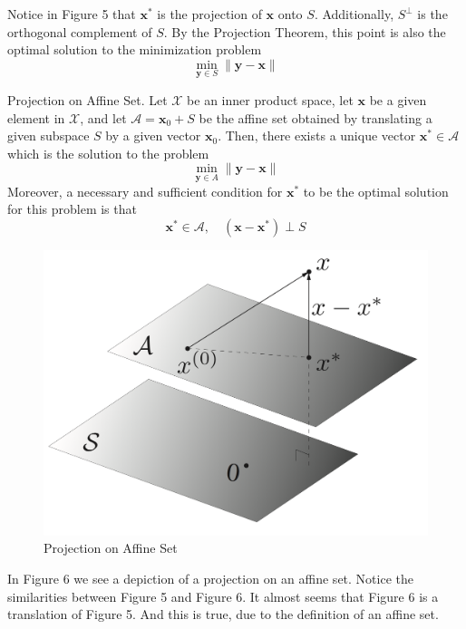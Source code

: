 \documentclass[12pt]{article}
\begin{document}
\noindent Notice in Figure 5 that $\mathbf{x}^*$ is the projection of $\mathbf{x}$ onto $S$. Additionally, $S^\perp$ is the orthogonal complement of $S$. By the Projection Theorem, this point is also the optimal solution to the minimization problem  $$\min_{\mathbf{y}\in S} \|\mathbf{y}-\mathbf{x}\|$$

\begin{corollary}
Projection on Affine Set. Let $\mathcal{X}$ be an inner product space, let $\mathbf{x}$ be a given element in $\mathcal{X}$, and let $\mathcal{A}=\mathbf{x}_0 + S$ be the affine set obtained by translating a given subspace $S$ by a given vector $\mathbf{x}_0$. Then, there exists a unique vector $\mathbf{x}^*\in\mathcal{A}$ which is the solution to the problem $$\min_{\mathbf{y}\in A} \|\mathbf{y}-\mathbf{x}\|$$ Moreover, a necessary and sufficient condition for $\mathbf{x}^*$ to be the optimal solution for this problem is that $$\mathbf{x}^*\in \mathcal{A},\quad (\mathbf{x}-\mathbf{x}^*)\perp S$$
\end{corollary}

\begin{figure}[h!]\begin{center}\includegraphics[scale=0.3]{figures/proj2}\caption{Projection on Affine Set}\end{center}\end{figure}

\noindent In Figure 6 we see a depiction of a projection on an affine set. Notice the similarities between Figure 5 and Figure 6. It almost seems that Figure 6 is a translation of Figure 5. And this is true, due to the definition of an affine set.
\end{document}
